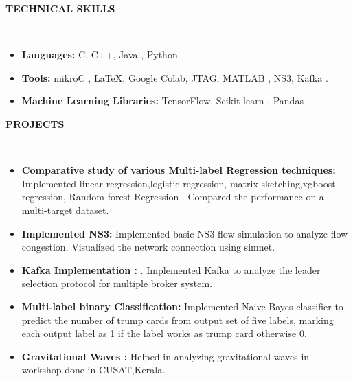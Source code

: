 \documentclass[a4paper,10pt]{article}
\newcommand{\isep}{-2 pt}
\newcommand{\lsep}{-0.5cm}
\newcommand{\resheading}[1]{{\small \colorbox{MyBlue}{\begin{minipage}{0.975\textwidth}{\textbf{#1 \vphantom{p\^{E}}}}\end{minipage}}}}
\begin{document}
\resheading{\textbf{TECHNICAL SKILLS} }\\[\lsep]
\begin{itemize}
\item \noindent \textbf{Languages: } C, C++, Java , Python
\item \noindent \textbf{Tools: } mikroC , \LaTeX, Google Colab, JTAG, MATLAB , NS3, Kafka .
\item \noindent \textbf{Machine Learning Libraries:} TensorFlow, Scikit-learn , Pandas 
\end{itemize}

\resheading{\textbf{PROJECTS} }\\[\lsep]


\begin{itemize}\itemsep \isep
\item \textbf{Comparative study of various Multi-label Regression techniques:} Implemented linear regression,logistic regression, matrix sketching,xgboost regression, Random forest Regression . Compared the performance on a multi-target dataset.

\item \textbf{Implemented NS3:} Implemented basic NS3 flow simulation to analyze flow congestion. Visualized the network connection using simnet.

 \item \textbf{Kafka Implementation :} .
 Implemented Kafka to analyze the leader selection protocol for multiple broker system.
 
\item \textbf{Multi-label binary Classification: } Implemented Naive Bayes classifier to predict the number of trump cards from output set of five labels, marking each output label as 1 if the label works as trump card otherwise 0.

\item \textbf{Gravitational Waves :} Helped in analyzing gravitational waves in workshop done in CUSAT,Kerala.

\end{itemize}
\end{document}
